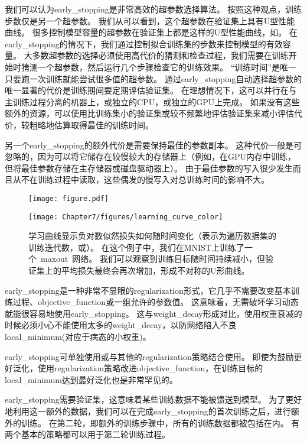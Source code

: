 我们可以认为\gls{early_stopping}是非常高效的超参数选择算法。
按照这种观点，训练步数仅是另一个超参数。
我们从可以看到，这个超参数在验证集上具有U型性能曲线。
很多控制模型容量的超参数在验证集上都是这样的U型性能曲线，如。
在\gls{early_stopping}的情况下，我们通过控制拟合训练集的步数来控制模型的有效容量。
大多数超参数的选择必须使用高代价的猜测和检查过程，我们需要在训练开始时猜测一个超参数，然后运行几个步骤检查它的训练效果。
``训练时间''是唯一只要跑一次训练就能尝试很多值的超参数。
通过\gls{early_stopping}自动选择超参数的唯一显著的代价是训练期间要定期评估验证集。
在理想情况下，这可以并行在与主训练过程分离的机器上，或独立的CPU，或独立的GPU上完成。
如果没有这些额外的资源，可以使用比训练集小的验证集或较不频繁地评估验证集来减小评估代价，较粗略地估算取得最佳的训练时间。

另一个\gls{early_stopping}的额外代价是需要保持最佳的参数副本。
这种代价一般是可忽略的，因为可以将它储存在较慢较大的存储器上（例如，在GPU内存中训练，但将最佳参数存储在主存储器或磁盘驱动器上）。
由于最佳参数的写入很少发生而且从不在训练过程中读取，这些偶发的慢写入对总训练时间的影响不大。

\begin{figure}[!htb]
\ifOpenSource
\centerline{\texttt{[image: figure.pdf]}}
\else
\centerline{\texttt{[image: Chapter7/figures/learning\_curve\_color]}}
\fi
\caption{学习曲线显示负对数似然损失如何随时间变化（表示为遍历数据集的训练迭代数，或）。
在这个例子中，我们在MNIST上训练了一个~\gls{maxout}~网络。
我们可以观察到训练目标随时间持续减小，但验证集上的平均损失最终会再次增加，形成不对称的U形曲线。
}
\label{fig:chap7_learning_curve}
\end{figure}


\gls{early_stopping}是一种非常不显眼的\gls{regularization}形式，它几乎不需要改变基本训练过程、\gls{objective_function}或一组允许的参数值。
这意味着，无需破坏学习动态就能很容易地使用\gls{early_stopping}。
这与\gls{weight_decay}形成对比，使用权重衰减的时候必须小心不能使用太多的\gls{weight_decay}，以防网络陷入不良\gls{local_minimum}(对应于病态的小权重)。

\gls{early_stopping}可单独使用或与其他的\gls{regularization}策略结合使用。
即使为鼓励更好泛化，使用\gls{regularization}策略改进\gls{objective_function}，在训练目标的\gls{local_minimum}达到最好泛化也是非常罕见的。

\gls{early_stopping}需要验证集，这意味着某些训练数据不能被馈送到模型。
为了更好地利用这一额外的数据，我们可以在完成\gls{early_stopping}的首次训练之后，进行额外的训练。
在第二轮，即额外的训练步骤中，所有的训练数据都被包括在内。
有两个基本的策略都可以用于第二轮训练过程。

